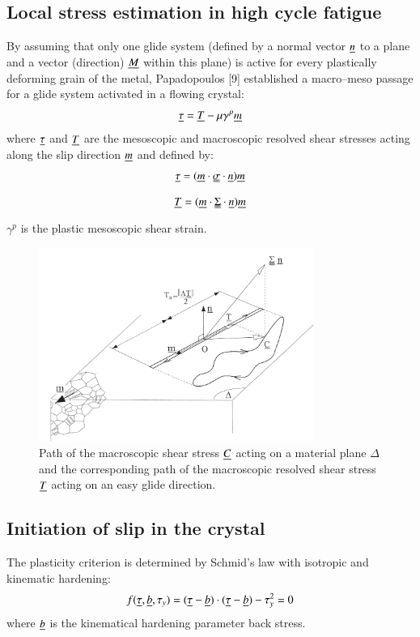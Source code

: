 \documentclass[3p,times,procedia,number]{elsarticle}
\begin{document}
\subsection{Local stress estimation in high cycle fatigue}
 By assuming that only one glide system (defined by a normal vector $\uline{n}$ to a plane and a vector
 (direction) $\uline{M}$ within this plane) is active for every plastically deforming grain of the metal, Papadopoulos [9]
 established a macro–meso passage for a glide system activated in a flowing crystal:
 \begin{equation}
\uline{\tau}=\uline{T}-\mu\gamma^p\uline{m}
 \label{macromeso}
 \end{equation}
 where $\uline{\tau}$ and $\uline{T}$ are the mesoscopic and macroscopic
 resolved shear stresses acting along the slip direction $\uline{m}$ and defined by:
  \begin{equation}
  \uline{\tau}=(\uline{m}\cdot\uuline{\sigma}\cdot\uline{n})\uline{m}
  \label{tau}
  \end{equation}
   \begin{equation}
   \uline{T}=(\uline{m}\cdot\uuline{\Sigma}\cdot\uline{n})\uline{m}
   \label{T}
   \end{equation}
 $\gamma^p$  is the plastic mesoscopic shear strain.
 \begin{figure}[h!]
 	\centering
 	\includegraphics[width=0.8\textwidth]{figures//glid.png} 
 	\caption{Path of the macroscopic shear stress $\uline{C}$ acting on a material plane $\Delta$ and the corresponding path of the macroscopic resolved shear stress $\uline{T}$ acting on an easy glide direction.}
 	\label{glid}
 \end{figure}
\subsection{Initiation of slip in the crystal}
The plasticity criterion is determined by Schmid's law with isotropic and kinematic hardening:
\begin{equation}
f(\uline{\tau},\uline{b},\tau_y)=(\uline{\tau}-\uline{b})\cdot(\uline{\tau}-\uline{b})-\tau_y^2=0
\label{Schmid}
\end{equation}
where $\uline{b}$ is the kinematical hardening parameter back stress.
\end{document}

